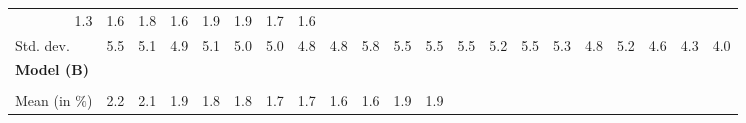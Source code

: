 \begin{tabular}{lllllllllllllllllllll}
  \multicolumn{1}{r}{1.3} &
  \multicolumn{1}{r}{1.6} &
  \multicolumn{1}{r}{1.8} &
  \multicolumn{1}{r}{1.6} &
  \multicolumn{1}{r}{1.9} &
  \multicolumn{1}{r}{1.9} &
  \multicolumn{1}{r}{1.7} &
  \multicolumn{1}{r}{1.6} \\
\multicolumn{1}{l}{\hspace{2em}Std. dev.} &
  \multicolumn{1}{|r}{5.5} &
  \multicolumn{1}{r}{5.1} &
  \multicolumn{1}{r}{4.9} &
  \multicolumn{1}{r}{5.1} &
  \multicolumn{1}{r}{5.0} &
  \multicolumn{1}{r}{5.0} &
  \multicolumn{1}{r}{4.8} &
  \multicolumn{1}{r}{4.8} &
  \multicolumn{1}{r}{5.8} &
  \multicolumn{1}{r}{5.5} &
  \multicolumn{1}{r}{5.5} &
  \multicolumn{1}{r}{5.5} &
  \multicolumn{1}{r}{5.2} &
  \multicolumn{1}{r}{5.5} &
  \multicolumn{1}{r}{5.3} &
  \multicolumn{1}{r}{4.8} &
  \multicolumn{1}{r}{5.2} &
  \multicolumn{1}{r}{4.6} &
  \multicolumn{1}{r}{4.3} &
  \multicolumn{1}{r}{4.0} \\
\multicolumn{1}{l}{{\textbf{Model (B)}}} &
  \multicolumn{1}{|r}{} &
  \multicolumn{1}{r}{} &
  \multicolumn{1}{r}{} &
  \multicolumn{1}{r}{} &
  \multicolumn{1}{r}{} &
  \multicolumn{1}{r}{} &
  \multicolumn{1}{r}{} &
  \multicolumn{1}{r}{} &
  \multicolumn{1}{r}{} &
  \multicolumn{1}{r}{} &
  \multicolumn{1}{r}{} &
  \multicolumn{1}{r}{} &
  \multicolumn{1}{r}{} &
  \multicolumn{1}{r}{} &
  \multicolumn{1}{r}{} &
  \multicolumn{1}{r}{} &
  \multicolumn{1}{r}{} &
  \multicolumn{1}{r}{} &
  \multicolumn{1}{r}{} &
  \multicolumn{1}{r}{} \\
\multicolumn{1}{l}{\hspace{1em}{\textit{Multiplicative term} ($\widehat{\tau}^{adv}$)}} &
  \multicolumn{1}{|r}{} &
  \multicolumn{1}{r}{} &
  \multicolumn{1}{r}{} &
  \multicolumn{1}{r}{} &
  \multicolumn{1}{r}{} &
  \multicolumn{1}{r}{} &
  \multicolumn{1}{r}{} &
  \multicolumn{1}{r}{} &
  \multicolumn{1}{r}{} &
  \multicolumn{1}{r}{} &
  \multicolumn{1}{r}{} &
  \multicolumn{1}{r}{} &
  \multicolumn{1}{r}{} &
  \multicolumn{1}{r}{} &
  \multicolumn{1}{r}{} &
  \multicolumn{1}{r}{} &
  \multicolumn{1}{r}{} &
  \multicolumn{1}{r}{} &
  \multicolumn{1}{r}{} &
  \multicolumn{1}{r}{} \\
\multicolumn{1}{l}{\hspace{2em}Mean (in $\%$)} &
  \multicolumn{1}{|r}{2.2} &
  \multicolumn{1}{r}{2.1} &
  \multicolumn{1}{r}{1.9} &
  \multicolumn{1}{r}{1.8} &
  \multicolumn{1}{r}{1.8} &
  \multicolumn{1}{r}{1.7} &
  \multicolumn{1}{r}{1.7} &
  \multicolumn{1}{r}{1.6} &
  \multicolumn{1}{r}{1.6} &
  \multicolumn{1}{r}{1.9} &
  \multicolumn{1}{r}{1.9} &

\end{tabular}
